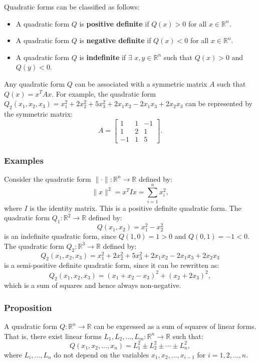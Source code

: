 \documentclass[11pt]{article}
\begin{document}
Quadratic forms can be classified as follows:
\begin{itemize}
    \item A quadratic form \(Q\) is \textbf{positive definite} if \(Q(x) > 0\) for all \(x \in \mathbb{R}^n\).
    \item A quadratic form \(Q\) is \textbf{negative definite} if \(Q(x) < 0\) for all \(x \in \mathbb{R}^n\).
    \item A quadratic form \(Q\) is \textbf{indefinite} if \(\exists\) \(x, y \in \mathbb{R}^n\) such that \(Q(x) > 0\) and \(Q(y) < 0\).
\end{itemize}

Any quadratic form \(Q\) can be associated with a symmetric matrix \(A\) such that \(Q(x) = x^T A x\). For example, the quadratic form \(Q_2(x_1, x_2, x_3) = x_1^2 + 2 x_2^2 + 5 x_3^2 + 2 x_1 x_2 - 2 x_1 x_3 + 2 x_2 x_3\) can be represented by the symmetric matrix:
\[A = \begin{bmatrix}
1 & 1 & -1 \\
1 & 2 & 1 \\
-1 & 1 & 5
\end{bmatrix}.\]

\subsubsection*{Examples}
Consider the quadratic form \(\|\cdot\| : \mathbb{R}^n \to \mathbb{R}\) defined by:
\[\|x\|^2 = x^T I x = \sum_{i=1}^n x_i^2,\]
where \(I\) is the identity matrix. This is a positive definite quadratic form.
\vskip 0.5cm
The quadratic form \(Q_1 : \mathbb{R}^2 \to \mathbb{R}\) defined by:
\[Q(x_1, x_2) = x_1^2 - x_2^2\]
is an indefinite quadratic form, since \(Q(1, 0) = 1 > 0\) and \(Q(0, 1) = -1 < 0\).
\vskip 0.5cm
The quadratic form \(Q_2 : \mathbb{R}^3 \to \mathbb{R}\) defined by:
\[Q_2(x_1, x_2, x_3) = x_1^2 + 2 x_2^2 + 5 x_3^2 + 2 x_1 x_2 - 2 x_1 x_3 + 2 x_2 x_3\]
is a semi-positive definite quadratic form, since it can be rewritten as:
\[Q_2(x_1, x_2, x_3) = (x_1 + x_2 - x_3)^2 + (x_2 + 2 x_3)^2,\]
which is a sum of squares and hence always non-negative.

\subsubsection*{Proposition}
A quadratic form \(Q : \mathbb{R}^n \to \mathbb{R}\) can be expressed as a sum of squares of linear forms. That is, there exist linear forms \(L_1, L_2, \ldots, L_m : \mathbb{R}^n \to \mathbb{R}\) such that:
\[Q(x_1, x_2, \ldots, x_n) = L_1^2 \pm L_2^2 \pm \cdots \pm L_n^2,\]
where \(L_i, \dots, L_n\) do not depend on the variables \(x_1, x_2, \ldots, x_{i-1}\) for \(i = 1, 2, \ldots, n\).
\end{document}

